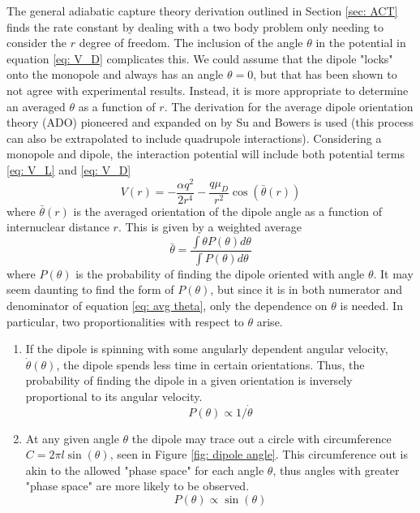 The general adiabatic capture theory derivation outlined in Section \ref{sec: ACT} finds the rate constant by dealing with a two body problem only needing to consider the $r$ degree of freedom. The inclusion of the angle $\theta$ in the potential in equation \ref{eq: V_D} complicates this. We could assume that the dipole "locks" onto the monopole and always has an angle $\theta=0$, but that has been shown to not agree with experimental results.\cite{Su1973a} Instead, it is more appropriate to determine an averaged $\theta$ as a function of $r$. The derivation for the average dipole orientation theory (ADO) pioneered and expanded on by Su and Bowers is used (this process can also be extrapolated to include quadrupole interactions\cite{Su1975}).\cite{Su1973, Su1973a} Considering a monopole and dipole, the interaction potential will include both potential terms \ref{eq: V_L} and \ref{eq: V_D}
\begin{equation}
    V(r) = -\frac{\alpha q^2}{2r^4} - \frac{q\mu_D}{r^2} \cos\left(\bar{\theta}(r)\right)
    \label{eq: V_L+V_D}
\end{equation}
where $\bar{\theta}(r)$ is the averaged orientation of the dipole angle as a function of internuclear distance $r$. This is given by a weighted average
\begin{equation}
	\bar{\theta} = \dfrac{\int \theta P(\theta) d\theta}{\int P(\theta) d\theta} \label{eq: avg theta}
\end{equation}
where $P(\theta)$ is the probability of finding the dipole oriented with angle $\theta$. It may seem daunting to find the form of $P(\theta)$, but since it is in both numerator and denominator of equation \ref{eq: avg theta}, only the dependence on $\theta$ is needed. In particular, two proportionalities with respect to $\theta$ arise.
\begin{enumerate}
	\item If the dipole is spinning with some angularly dependent angular velocity, $\dot{\theta}(\theta)$, the dipole spends less time in certain orientations. Thus, the probability of finding the dipole in a given orientation is inversely proportional to its angular velocity.
	\begin{equation}
		P(\theta) \propto 1/\dot{\theta} \label{eq: prop case 1}
	\end{equation}
	\item At any given angle $\theta$ the dipole may trace out a circle with circumference $C = 2\pi l \sin(\theta)$, seen in Figure \ref{fig: dipole angle}. This circumference out is akin to the allowed "phase space" for each angle $\theta$, thus angles with greater "phase space" are more likely to be observed.
	\begin{equation}
		P(\theta) \propto \sin(\theta) \label{eq: prop case 2}
	\end{equation}
\end{enumerate}

